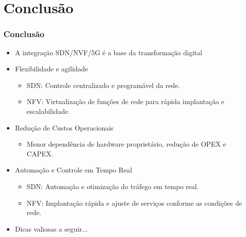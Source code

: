 
\section{Conclusão}
\begin{frame}
    \frametitle{Conclusão}
    \begin{itemize}
        \item A integração SDN/NVF/5G é a base da transformação digital
        \item Flexibilidade e agilidade
        \begin{itemize}
            \item SDN: Controle centralizado e programável da rede.
            \item NFV: Virtualização de funções de rede para rápida implantação e escalabilidade.
        \end{itemize}
        \item Redução de Custos Operacionais
        \begin{itemize}
            \item Menor dependência de hardware proprietário, redução de OPEX e CAPEX.
        \end{itemize}
        \item Automação e Controle em Tempo Real
        \begin{itemize}
            \item SDN: Automação e otimização do tráfego em tempo real.
            \item NFV: Implantação rápida e ajuste de serviços conforme as condições de rede.
        \end{itemize}
        \item Dicas valiosas a seguir...
    \end{itemize}
\end{frame}

